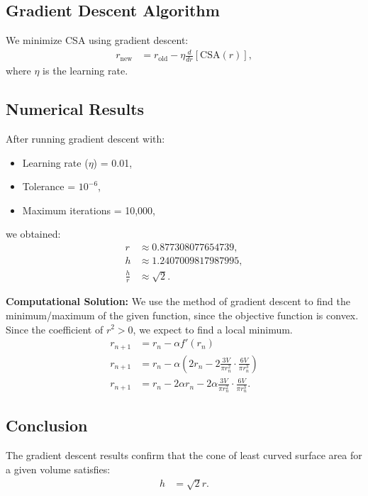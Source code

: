 \documentclass[article]{IEEEtran}
\numberwithin{figure}{enumi}
\begin{document}
\subsection*{Gradient Descent Algorithm}

We minimize CSA using gradient descent:
\begin{align}
r_{\text{new}} &= r_{\text{old}} - \eta \frac{d}{dr}[\text{CSA}(r)],
\end{align}
where \(\eta\) is the learning rate.

\subsection*{Numerical Results}

After running gradient descent with:
\begin{itemize}
    \item Learning rate (\(\eta\)) = 0.01,
    \item Tolerance = \(10^{-6}\),
    \item Maximum iterations = 10,000,
\end{itemize}
we obtained:
\begin{align}
r &\approx 0.877308077654739, \\
h &\approx 1.2407009817987995, \\
\frac{h}{r} &\approx \sqrt{2}.
\end{align}


    \item \textbf{Computational Solution:}
    We use the method of gradient descent to find the minimum/maximum of the given function, since the objective function is convex. Since the coefficient of $r^2 > 0$, we expect to find a local minimum.
   \begin{align}
    r_{n+1} &= r_n - \alpha f'(r_n) \\
    r_{n+1} &= r_n - \alpha \left( 2r_n - 2 \frac{3V}{\pi r_n^2} \cdot \frac{6V}{\pi r_n^3} \right) \\
    r_{n+1} &= r_n - 2\alpha r_n - 2\alpha \frac{3V}{\pi r_n^2} \cdot \frac{6V}{\pi r_n^3}.
\end{align}

    \subsection*{Conclusion}

The gradient descent results confirm that the cone of least curved surface area for a given volume satisfies:
\begin{align}
h &= \sqrt{2}r.
\end{align}
\end{document}
